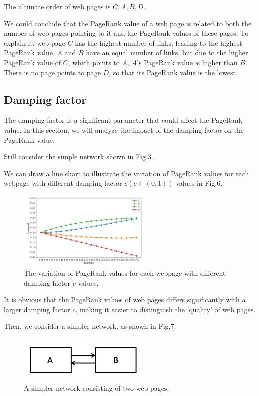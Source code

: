 \documentclass[lettersize,journal,12pt,conference]{IEEEtran}
\begin{document}
The ultimate order of web pages is $C, A, B, D$. 

We could conclude that the PageRank value of a web page is related to both the number of web pages pointing to it and the PageRank values of these pages. To explain it, web page $C$ has the highest number of links, leading to the highest PageRank value. $A$ and $B$ have an equal number of links, but due to the higher PageRank value of $C$, which points to $A$, $A$'s PageRank value is higher than $B$. There is no page points to page $D$, so that its PageRank value is the lowest.

\subsection{Damping factor}

The damping factor is a significant parameter that could affect the PageRank value. In this section, we will analyze the impact of the damping factor on the PageRank value.

Still consider the simple network shown in Fig.3.

We can draw a line chart to illustrate the variation of PageRank values for each webpage with different damping factor $c (c \in (0,1))$ values in Fig.6.

\begin{figure}[h]
	\centering
	\includegraphics[width=2.5in]{images/fig8.png}
	\caption{The variation of PageRank values for each webpage with different damping factor $c$ values.}
	\label{fig8}
\end{figure}

It is obvious that the PageRank values of web pages differs significantly with a larger damping factor $c$, making it easier to distinguish the 'quality' of web pages. 

Then, we consider a simpler network, as shown in Fig.7.

\begin{figure}[h]
	\centering
	\includegraphics[width=2.5in]{images/fig9.png}
	\caption{A simpler network consisting of two web pages.}
	\label{fig9}
\end{figure}
\end{document}

